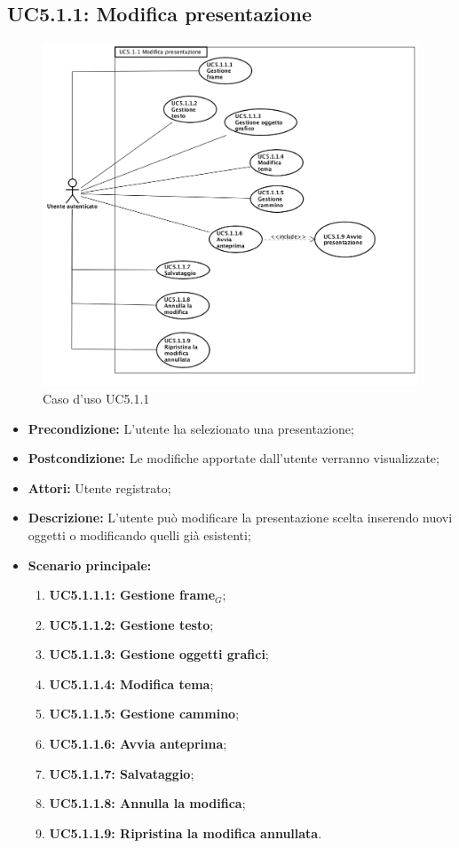 \subsection{ UC5.1.1: Modifica presentazione}

\begin{figure}[h]
	\begin{center}
	\includegraphics[scale=0.4]{diagram/UC5-1-1.png}
	\caption{Caso d'uso UC5.1.1}
	\end{center}
\end{figure}
\begin{itemize}
	\item \textbf{Precondizione:} L'utente ha selezionato una presentazione;
	\item \textbf{Postcondizione:} Le modifiche apportate dall'utente verranno visualizzate;
	\item \textbf{Attori:} Utente registrato;
	\item \textbf{Descrizione:} L'utente può modificare la presentazione scelta inserendo nuovi oggetti o modificando quelli già esistenti;
	\item \textbf{Scenario principale:}
	\begin{enumerate}
		\item \textbf{ UC5.1.1.1: Gestione frame$_G$};
		\item \textbf{ UC5.1.1.2: Gestione testo};
		\item \textbf{ UC5.1.1.3: Gestione oggetti grafici};
		\item \textbf{ UC5.1.1.4: Modifica tema};
		\item \textbf{ UC5.1.1.5: Gestione cammino};
		\item \textbf{ UC5.1.1.6: Avvia anteprima};
		\item \textbf{ UC5.1.1.7: Salvataggio};
		\item \textbf{ UC5.1.1.8: Annulla la modifica};
		\item \textbf{ UC5.1.1.9: Ripristina la modifica annullata}.
	\end{enumerate}
\end{itemize}
